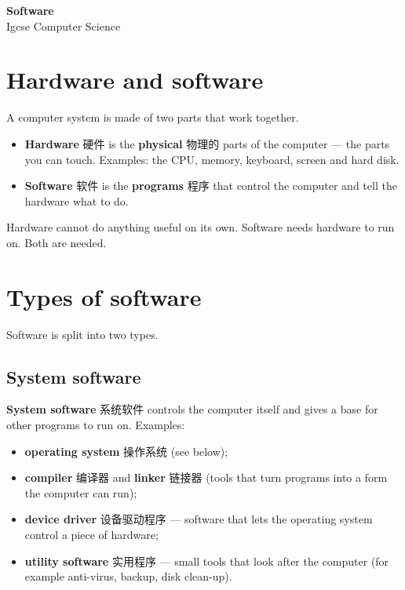 \documentclass[11pt]{article}
\begin{document}
\begin{center}
  {\LARGE\bfseries Software}\\[0.35em]
  {\large Igcse Computer Science}
\end{center}
\vspace{0.6em}

\section*{Hardware and software}

A computer system is made of two parts that work together.

\begin{itemize}
\item \textbf{Hardware} 硬件 is the \textbf{physical} 物理的 parts of the computer — the parts you can touch. Examples: the CPU, memory, keyboard, screen and hard disk.

\item \textbf{Software} 软件 is the \textbf{programs} 程序 that control the computer and tell the hardware what to do.

\end{itemize}

Hardware cannot do anything useful on its own. Software needs hardware to run on. Both are needed.

\section*{Types of software}

Software is split into two types.

\subsection*{System software}

\textbf{System software} 系统软件 controls the computer itself and gives a base for other programs to run on. Examples:

\begin{itemize}
\item \textbf{operating system} 操作系统 (see below);

\item \textbf{compiler} 编译器 and \textbf{linker} 链接器 (tools that turn programs into a form the computer can run);

\item \textbf{device driver} 设备驱动程序 — software that lets the operating system control a piece of hardware;

\item \textbf{utility software} 实用程序 — small tools that look after the computer (for example anti-virus, backup, disk clean-up).

\end{itemize}
\end{document}
